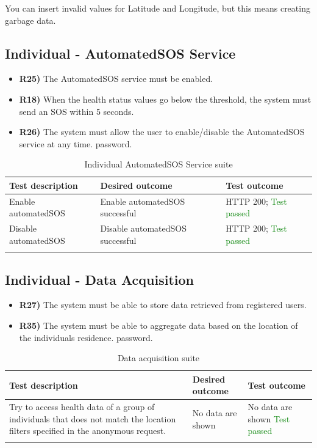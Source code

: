 \documentclass[titlepage]{article}
\begin{document}
\noindent
You can insert invalid values for Latitude and Longitude, but this means creating garbage data.


\subsection{Individual - AutomatedSOS Service}
\begin{itemize}
    \item {\bf R25)} The AutomatedSOS service must be enabled.
    \item {\bf R18)} When the health status values go below the threshold, the system must send an SOS within 5 seconds.
    \item {\bf R26)} The system must allow the user to enable/disable the AutomatedSOS service at any time.
 password.
\end{itemize}

\begin{longtable}{| p{3 cm} | p{4 cm} | p{4 cm} |} \hline
    {\bf Test description} & {\bf Desired outcome} & {\bf Test outcome} \\ \hline
    Enable automatedSOS & 
    Enable automatedSOS successful
        & HTTP 200; \textcolor{green}{Test passed} \\ \hline
    Disable automatedSOS & 
    Disable automatedSOS successful
        & HTTP 200; \textcolor{green}{Test passed} \\ \hline
    \caption{Individual AutomatedSOS Service suite}
\end{longtable}

\subsection{Individual - Data Acquisition}
\begin{itemize}
    \item {\bf R27)} The system must be able to store data retrieved from registered users.
    \item {\bf R35)}  The system must be able to aggregate data based on the location of the individuals residence.
 password.
\end{itemize}

\begin{longtable}{| p{3 cm} | p{4 cm} | p{4 cm} |} \hline
    {\bf Test description} & {\bf Desired outcome} & {\bf Test outcome} \\ \hline
    Try to access health data of a group of individuals that does not match the location filters specified in the anonymous request. & 
    No data are shown
        & No data are shown \textcolor{green}{Test passed} \\ \hline
    \caption{Data acquisition suite}
\end{longtable}
\end{document}
